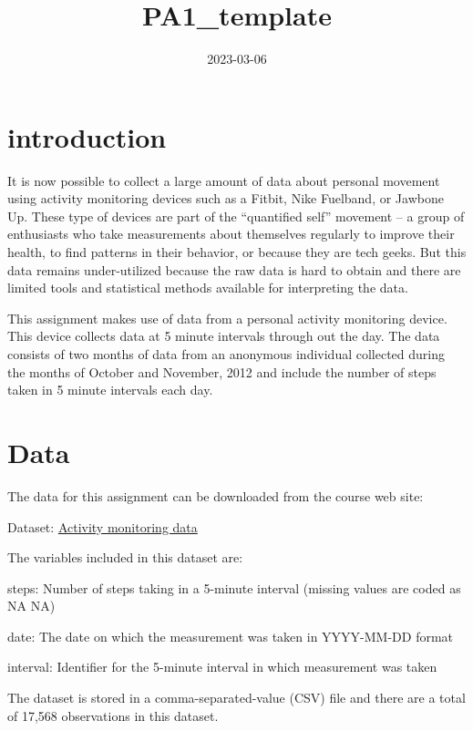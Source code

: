 \documentclass[
]{article}
\title{PA1\_template}
\author{}
\date{\vspace{-2.5em}2023-03-06}
\begin{document}
\maketitle

\hypertarget{introduction}{%
\section{introduction}\label{introduction}}

It is now possible to collect a large amount of data about personal
movement using activity monitoring devices such as a Fitbit, Nike
Fuelband, or Jawbone Up. These type of devices are part of the
``quantified self'' movement -- a group of enthusiasts who take
measurements about themselves regularly to improve their health, to find
patterns in their behavior, or because they are tech geeks. But this
data remains under-utilized because the raw data is hard to obtain and
there are limited tools and statistical methods available for
interpreting the data.

This assignment makes use of data from a personal activity monitoring
device. This device collects data at 5 minute intervals through out the
day. The data consists of two months of data from an anonymous
individual collected during the months of October and November, 2012 and
include the number of steps taken in 5 minute intervals each day.

\hypertarget{data}{%
\section{Data}\label{data}}

The data for this assignment can be downloaded from the course web site:

Dataset:
\href{https://d396qusza40orc.cloudfront.net/repdata\%2Fdata\%2Factivity.zip}{Activity
monitoring data}

The variables included in this dataset are:

steps: Number of steps taking in a 5-minute interval (missing values are
coded as NA NA)

date: The date on which the measurement was taken in YYYY-MM-DD format

interval: Identifier for the 5-minute interval in which measurement was
taken

The dataset is stored in a comma-separated-value (CSV) file and there
are a total of 17,568 observations in this dataset.
\end{document}
